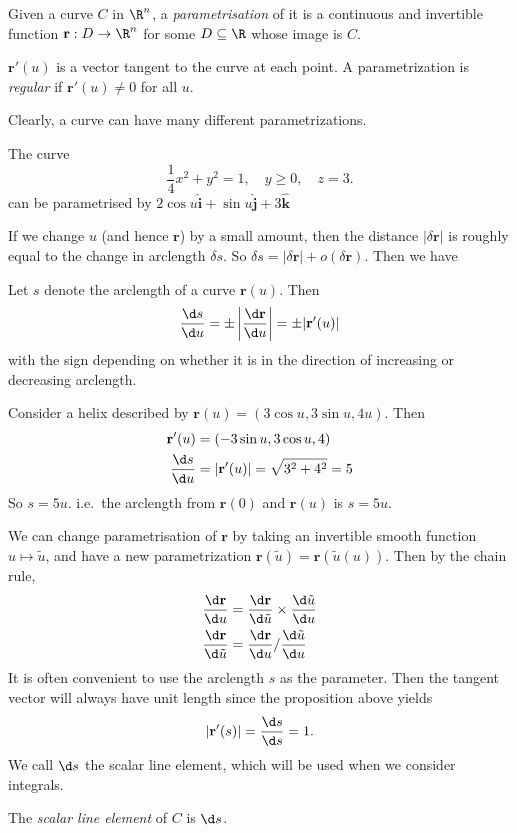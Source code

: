 \documentclass[a4paper]{article}
\begin{document}
\begin{defi}
  Given a curve $C$ in $\R^n$, a \emph{parametrisation} of it is a continuous and invertible function $\mathbf{r}: D\to \R^n$ for some $D\subseteq \R$ whose image is $C$.

  $\mathbf{r}'(u)$ is a vector tangent to the curve at each point. A parametrization is \emph{regular} if $\mathbf{r}'(u) \not= 0$ for all $u$.
\end{defi}
Clearly, a curve can have many different parametrizations.

\begin{eg}
  The curve
  \[
    \frac{1}{4}x^2 + y^2 = 1, \quad y \geq 0, \quad z = 3.
  \]
  can be parametrised by $2\cos u\hat{\mathbf{i}} + \sin u\hat{\mathbf{j}} + 3\hat{\mathbf{k}}$
\end{eg}
If we change $u$ (and hence $\mathbf{r}$) by a small amount, then the distance $|\delta \mathbf{r}|$ is roughly equal to the change in arclength $\delta s$. So $\delta s = |\delta \mathbf{r}| + o(\delta \mathbf{r})$. Then we have

\begin{prop}
  Let $s$ denote the arclength of a curve $\mathbf{r}(u)$. Then
  \[
    \frac{\d s}{\d u} = \pm \left|\frac{\d \mathbf{r}}{\d u}\right| = \pm |\mathbf{r}'(u)|
  \]
  with the sign depending on whether it is in the direction of increasing or decreasing arclength.
\end{prop}

\begin{eg}
  Consider a helix described by $\mathbf{r}(u) = (3\cos u, 3\sin u, 4u)$. Then
  \begin{align*}
    \mathbf{r}'(u) &= (-3\sin u, 3\cos u, 4)\\
    \frac{\d s}{\d u} &= |\mathbf{r}'(u)| = \sqrt{3^2 + 4^2} = 5
  \end{align*}
  So $s = 5u$. i.e.\ the arclength from $\mathbf{r}(0)$ and $\mathbf{r}(u)$ is $s = 5u$.
\end{eg}

We can change parametrisation of $\mathbf{r}$ by taking an invertible smooth function $u\mapsto \tilde{u}$, and have a new parametrization $\mathbf{r}(\tilde{u}) = \mathbf{r}(\tilde{u}(u))$. Then by the chain rule,
\begin{align*}
  \frac{\d \mathbf{r}}{\d u} &= \frac{\d \mathbf{r}}{\d \tilde{u}}\times \frac{\d \tilde{u}}{\d u}\\
  \frac{\d \mathbf{r}}{\d \tilde{u}} &= \frac{\d \mathbf{r}}{\d u}/ \frac{\d \tilde{u}}{\d u}
\end{align*}
It is often convenient to use the arclength $s$ as the parameter. Then the tangent vector will always have unit length since the proposition above yields
\[
  |\mathbf{r}'(s)| = \frac{\d s}{\d s} = 1.
\]
We call $\d s$ the scalar line element, which will be used when we consider integrals.
\begin{defi}
  The \emph{scalar line element} of $C$ is $\d s$.
\end{defi}
\end{document}
